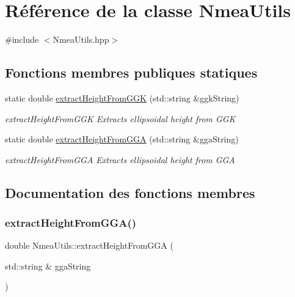 \hypertarget{classNmeaUtils}{}\section{Référence de la classe Nmea\+Utils}
\label{classNmeaUtils}


{\ttfamily \#include $<$Nmea\+Utils.\+hpp$>$}

\subsection*{Fonctions membres publiques statiques}
\begin{DoxyCompactItemize}
\item 
static double \hyperlink{classNmeaUtils_a35921c270ebfc026fd911ad8c18e8328}{extract\+Height\+From\+G\+GK} (std\+::string \&ggk\+String)
\begin{DoxyCompactList}\small\item\em extract\+Height\+From\+G\+GK Extracts ellipsoidal height from G\+GK \end{DoxyCompactList}\item 
static double \hyperlink{classNmeaUtils_a93ff32d3b56b1f032d801df2763d4f22}{extract\+Height\+From\+G\+GA} (std\+::string \&gga\+String)
\begin{DoxyCompactList}\small\item\em extract\+Height\+From\+G\+GA Extracts ellipsoidal height from G\+GA \end{DoxyCompactList}\end{DoxyCompactItemize}


\subsection{Documentation des fonctions membres}
\mbox{\label{classNmeaUtils_a93ff32d3b56b1f032d801df2763d4f22}} 
\subsubsection{\texorpdfstring{extract\+Height\+From\+G\+G\+A()}{extractHeightFromGGA()}}
{\footnotesize\ttfamily double Nmea\+Utils\+::extract\+Height\+From\+G\+GA (\begin{DoxyParamCaption}\item[{std\+::string \&}]{gga\+String }\end{DoxyParamCaption})\hspace{0.3cm}{\ttfamily [static]}}



